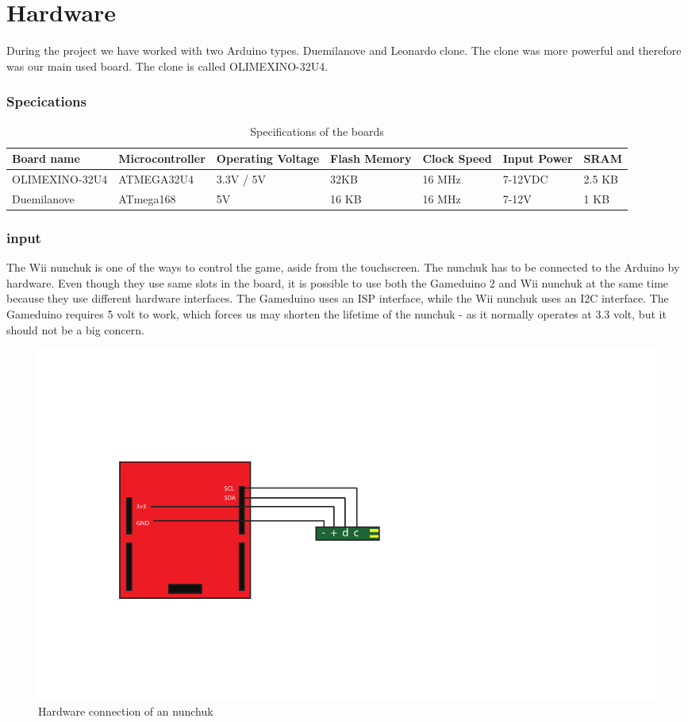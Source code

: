 \chapter{Hardware} %

During the project we have worked with two Arduino types. Duemilanove and Leonardo clone.
The clone was more powerful and therefore was our main used board. The clone is called
OLIMEXINO-32U4.
\subsection{Specications}


\begin{table}[h]
\resizebox{16cm}{!} {
    \begin{tabular}{l|l|l|l|lll}
    Board name     & Microcontroller & Operating Voltage & Flash Memory & Clock Speed & Input Power & SRAM   \\ \hline
    OLIMEXINO-32U4 & ATMEGA32U4      & 3.3V / 5V         & 32KB         & 16 MHz      & 7-12VDC     & 2.5 KB \\
    Duemilanove    & ATmega168       & 5V                & 16 KB        & 16 MHz      & 7-12V       & 1 KB   \\
    \end{tabular}
}
    \caption{Specifications of the boards}
\end{table}

\subsection{input}
The Wii nunchuk is one of the ways to control the game, aside from the
touchscreen.
The nunchuk has to be connected to the Arduino by hardware. Even though they
use same slots in the board, it is possible to use both the Gameduino 2 and Wii
nunchuk at the same time because they use different hardware interfaces. The
Gameduino uses an ISP interface, while the Wii nunchuk uses an I2C interface.
The Gameduino requires 5 volt to work, which forces us may shorten the lifetime
of the nunchuk - as it normally operates at 3.3 volt, but it should not be a
big concern.


\begin{figure}[h]
\centering
\includegraphics{Figures/NunchuckConnection}
\caption{Hardware connection of an nunchuk}
\label{fig:nunchuk_connect}
\end{figure}


